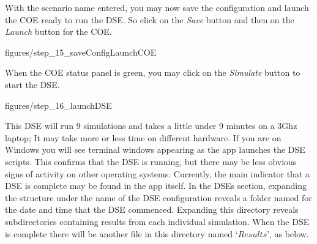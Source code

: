 \documentclass[11pt,a4paper]{../tutorial}
\begin{document}
{\newpage

With the scenario name entered, you may now save the configuration and launch the COE ready to run the DSE.  So click on the \emph{Save} button and then on the \emph{Launch} button for the COE.


\begin{center}\begin{annotation}[width=0.7\linewidth,trim=0 0 0 0,clip]{figures/step_15_saveConfigLaunchCOE}
    \end{annotation}\end{center}


When the COE status panel is green, you may click on the \emph{Simulate} button to start the DSE.



\begin{center}\begin{annotation}[width=0.7\linewidth,trim=0 0 0 0,clip]{figures/step_16_launchDSE}
    \end{annotation}\end{center}

\newpage
This DSE will run 9 simulations and takes a little under 9 minutes on a 3Ghz laptop; It may take more or less time on different hardware. If you are on Windows you will see terminal windows appearing as the app launches the DSE scripts. This confirms that the DSE is running, but there may be less obvious signs of activity on other operating systems.  Currently, the main indicator that a DSE is complete may be found in the app itself.  In the DSEs section, expanding the structure under the name of the DSE configuration reveals a folder named for the date and time that the DSE commenced.  Expanding this directory reveals subdirectories containing results from each individual simulation.  When the DSE is complete there will be another file in this directory named `$Results$’, as below.


}
\end{document}
